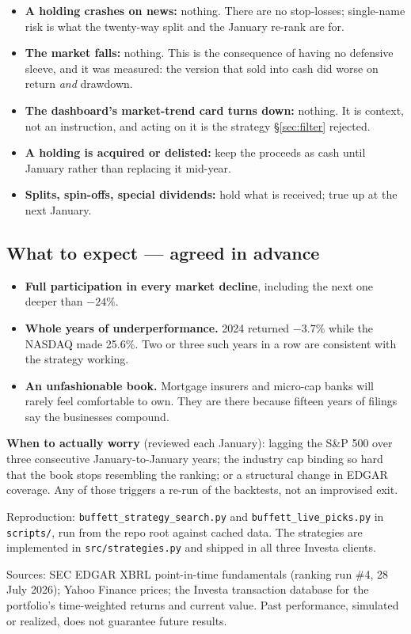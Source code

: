 \documentclass[11pt,a4paper]{article}
\begin{document}
\begin{itemize}[leftmargin=1.4em,itemsep=0.25em]
  \item \textbf{A holding crashes on news:} nothing. There are no stop-losses;
  single-name risk is what the twenty-way split and the January re-rank are for.
  \item \textbf{The market falls:} nothing. This is the consequence of having
  no defensive sleeve, and it was measured: the version that sold into cash did
  worse on return \emph{and} drawdown.
  \item \textbf{The dashboard's market-trend card turns down:} nothing. It is
  context, not an instruction, and acting on it is the strategy
  \S\ref{sec:filter} rejected.
  \item \textbf{A holding is acquired or delisted:} keep the proceeds as cash
  until January rather than replacing it mid-year.
  \item \textbf{Splits, spin-offs, special dividends:} hold what is received;
  true up at the next January.
\end{itemize}

\subsection{What to expect --- agreed in advance}

\begin{itemize}[leftmargin=1.4em,itemsep=0.25em]
  \item \textbf{Full participation in every market decline}, including the next
  one deeper than $-24\%$.
  \item \textbf{Whole years of underperformance.} 2024 returned $-3.7\%$ while
  the NASDAQ made 25.6\%. Two or three such years in a row are consistent with
  the strategy working.
  \item \textbf{An unfashionable book.} Mortgage insurers and micro-cap banks
  will rarely feel comfortable to own. They are there because fifteen years of
  filings say the businesses compound.
\end{itemize}

\textbf{When to actually worry} (reviewed each January): lagging the S\&P 500
over three consecutive January-to-January years; the industry cap binding so
hard that the book stops resembling the ranking; or a structural change in
EDGAR coverage. Any of those triggers a re-run of the backtests, not an
improvised exit.

\vspace{0.6em}
{\sloppy Reproduction: \texttt{buffett\_strategy\_search.py} and
\texttt{buffett\_live\_picks.py} in \texttt{scripts/}, run from the repo root
against cached data. The strategies are implemented in
\texttt{src/strategies.py} and shipped in all three Investa clients.\par}

\par\nopagebreak\vspace{0.5em}
{\sffamily\footnotesize\color{muted}
Sources: SEC EDGAR XBRL point-in-time fundamentals (ranking run \#4, 28 July
2026); Yahoo Finance prices; the Investa transaction database for the
portfolio's time-weighted returns and current value. Past performance,
simulated or realized, does not guarantee future results.}
\end{document}
